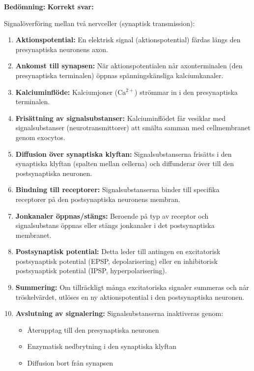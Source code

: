 \documentclass{exam}
\newenvironment{answer}
  {\begin{framed}\color{blue}\textbf{Bedömning:} }
  {\end{framed}}
\begin{document}
\begin{questions}
\begin{answer}
\textbf{Korrekt svar:}

Signalöverföring mellan två nervceller (synaptisk transmission):

\begin{enumerate}
  \item \textbf{Aktionspotential:} En elektrisk signal (aktionspotential) färdas längs den presynaptiska neuronens axon.
  
  \item \textbf{Ankomst till synapsen:} När aktionspotentialen når axonterminalen (den presynaptiska terminalen) öppnas spänningskänsliga kalciumkanaler.
  
  \item \textbf{Kalciuminflöde:} Kalciumjoner (Ca$^{2+}$) strömmar in i den presynaptiska terminalen.
  
  \item \textbf{Frisättning av signalsubstanser:} Kalciuminflödet får vesiklar med signalsubstanser (neurotransmittorer) att smälta samman med cellmembranet genom exocytos.
  
  \item \textbf{Diffusion över synaptiska klyftan:} Signalsubstanserna frisätts i den synaptiska klyftan (spalten mellan cellerna) och diffunderar över till den postsynaptiska neuronen.
  
  \item \textbf{Bindning till receptorer:} Signalsubstanserna binder till specifika receptorer på den postsynaptiska neuronens membran.
  
  \item \textbf{Jonkanaler öppnas/stängs:} Beroende på typ av receptor och signalsubstans öppnas eller stängs jonkanaler i det postsynaptiska membranet.
  
  \item \textbf{Postsynaptisk potential:} Detta leder till antingen en excitatorisk postsynaptisk potential (EPSP, depolarisering) eller en inhibitorisk postsynaptisk potential (IPSP, hyperpolarisering).
  
  \item \textbf{Summering:} Om tillräckligt många excitatoriska signaler summeras och når tröskelvärdet, utlöses en ny aktionspotential i den postsynaptiska neuronen.
  
  \item \textbf{Avslutning av signalering:} Signalsubstanserna inaktiveras genom:
  \begin{itemize}
    \item Återupptag till den presynaptiska neuronen
    \item Enzymatisk nedbrytning i den synaptiska klyftan
    \item Diffusion bort från synapsen
  \end{itemize}
\end{enumerate}


\end{answer}
\end{questions}
\end{document}
